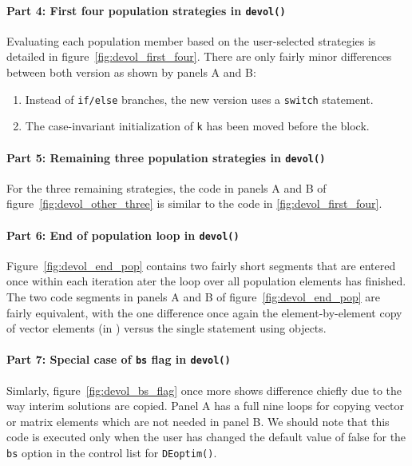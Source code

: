 \documentclass[nojss,shortnames,article]{jss}
\begin{document}
\paragraph{Part 4: First four population strategies in  \texttt{devol()}} 

Evaluating each population member based on the user-selected strategies is
detailed in figure~\ref{fig:devol_first_four}. There are only fairly minor differences
between both version as shown by panels A and B:
\begin{enumerate}
\item Instead of \verb|if/else| branches, the new version uses a
  \verb|switch| statement.
\item The case-invariant initialization of \verb|k| has been moved before the
  block.
\end{enumerate}

\paragraph{Part 5: Remaining three population strategies in  \texttt{devol()}} 

For the three remaining strategies, the code in panels A and B of
figure~\ref{fig:devol_other_three} is similar to the code in
\ref{fig:devol_first_four}.

\paragraph{Part 6: End of population loop in  \texttt{devol()}} 

Figure~\ref{fig:devol_end_pop} contains two fairly short segments that are
entered once within each iteration ater the loop over all population elements
has finished.  The two code segments in panels A and B of
figure~\ref{fig:devol_end_pop}  are fairly equivalent, with the one
difference once again the element-by-element copy of vector elements (in
) versus the single statement using  objects.

\paragraph{Part 7: Special case of \texttt{bs} flag in  \texttt{devol()}} 

Simlarly, figure~\ref{fig:devol_bs_flag} once more shows difference chiefly
due to the way interim solutions are copied. Panel A has a full nine loops
for copying vector or matrix elements which are not needed in panel B.  We
should note that this code is executed only when the user has changed the
default value of false for the \texttt{bs} option in the control list for
\texttt{DEoptim()}. 
\end{document}
